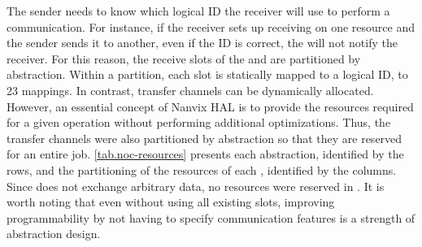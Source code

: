 			The sender needs to know which logical ID the receiver will use to perform
			a communication. For instance, if the receiver sets up receiving on one
			\dnoc resource and the sender sends it to another, even if the ID is correct,
			the \dma will not notify the receiver. For this reason, the receive slots
			of the \cnoc and \dnoc are  partitioned by abstraction. Within a
			partition, each slot is statically mapped to a logical ID,  to 23 mappings.
			In contrast, transfer channels can be dynamically allocated. However,
			an essential concept of Nanvix HAL is to provide the resources required for
			a given operation without performing additional optimizations. Thus, the
			transfer channels were also partitioned by abstraction so that they are
			reserved for an entire job. \autoref{tab.noc-resources} presents each
			abstraction, identified by the rows, and the partitioning of the resources
			of each \noc, identified by the columns. Since \sync does not exchange
			arbitrary data, no resources were reserved in \dnoc. It is worth
			noting that even without using all existing slots, improving
			programmability by not having to specify communication features is a
			strength of abstraction design.


